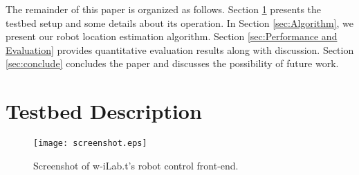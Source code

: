 \documentclass[journal]{IEEEtran} 				\IEEEoverridecommandlockouts 						\usepackage{amsmath,amssymb}
\begin{document}
The remainder of this paper is organized as follows. Section \ref{sec:Testbed} presents the testbed setup and some details about its operation. In Section \ref{sec:Algorithm}, we present our robot location estimation algorithm. Section \ref{sec:Performance and Evaluation} provides quantitative evaluation results along with discussion. Section \ref{sec:conclude} concludes the paper and discusses the possibility of future work.

\section{Testbed Description}\label{sec:Testbed}

\begin{figure*}[t]
\centering
  \texttt{[image: screenshot.eps]}
  \caption{Screenshot of w-iLab.t's robot control front-end.}
  \label{fig:screenshot}
\end{figure*}
\end{document}
